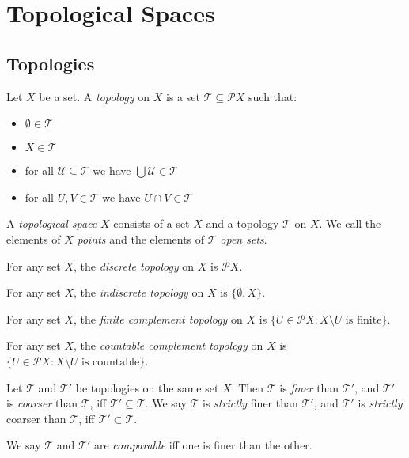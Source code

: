 \chapter{Topological Spaces}

\section{Topologies}

\begin{df}[Topology]
  Let $X$ be a set. A \emph{topology} on $X$ is a set $\mathcal{T} \subseteq \mathcal{P} X$ such that:
  \begin{itemize}
    \item
    $\emptyset \in \mathcal{T}$
    \item
    $X \in \mathcal{T}$
    \item
    for all $\mathcal{U} \subseteq \mathcal{T}$ we have $\bigcup \mathcal{U} \in \mathcal{T}$
    \item
    for all $U, V \in \mathcal{T}$ we have $U \cap V \in \mathcal{T}$
  \end{itemize}

  A \emph{topological space} $X$ consists of a set $X$ and a topology $\mathcal{T}$ on $X$. We call the elements of $X$ \emph{points} and the elements of $\mathcal{T}$ \emph{open sets}.
\end{df}

\begin{df}
  For any set $X$, the \emph{discrete topology} on $X$ is $\mathcal{P} X$.
\end{df}

\begin{df}
  For any set $X$, the \emph{indiscrete topology} on $X$ is $\{ \emptyset, X \}$.
\end{df}

\begin{df}
  For any set $X$, the \emph{finite complement topology} on $X$ is $\{ U \in \mathcal{P} X : X \setminus U \text{ is finite} \}$.
\end{df}

\begin{df}
  For any set $X$, the \emph{countable complement topology} on $X$ is $\{ U \in \mathcal{P} X : X \setminus U \text{ is countable} \}$.
\end{df}

\begin{df}
Let $\mathcal{T}$ and $\mathcal{T}'$ be topologies on the same set $X$. Then $\mathcal{T}$ is \emph{finer} than $\mathcal{T}'$, and $\mathcal{T}'$ is \emph{coarser} than $\mathcal{T}$, iff $\mathcal{T}' \subseteq \mathcal{T}$. We say $\mathcal{T}$ is \emph{strictly} finer than
$\mathcal{T}'$, and $\mathcal{T}'$ is \emph{strictly} coarser than $\mathcal{T}$, iff $\mathcal{T}' \subset \mathcal{T}$.

We say $\mathcal{T}$ and $\mathcal{T}'$ are \emph{comparable} iff one is finer than the other.
\end{df}

